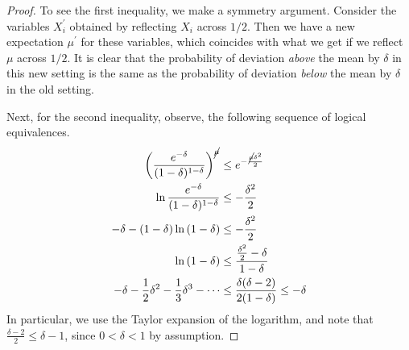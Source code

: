 \documentclass[11pt]{article}
\begin{document}
\begin{proof}
    To see the first inequality, we make a symmetry argument.
    Consider the variables $X^\prime_i$ obtained by reflecting $X_i$ across
    $1/2$.
    Then we have a new expectation $\mu^\prime$ for these variables, which
    coincides with what we get if we reflect $\mu$ across $1/2$.
    It is clear that the probability of deviation \emph{above} the mean by
    $\delta$ in this new setting is the same as the probability of deviation
    \emph{below} the mean by $\delta$ in the old setting.

    Next, for the second inequality, observe, the following sequence of logical
    equivalences.
    \begin{align*}
        \left(
            \frac{e^{-\delta}}{(1-\delta)^{1-\delta}}
        \right)^{\cancel{\mu}}
        &\leq
        e^{- \frac{\cancel{\mu} \delta^2}{2}}
        \\
        \ln{\frac{e^{-\delta}}{(1-\delta)^{1-\delta}}}
        &\leq
        -\frac{\delta^2}{2}
        \\
        -\delta - (1-\delta) \ln{\left(1-\delta\right)}
        &\leq
        -\frac{\delta^2}{2}
        \\
        \ln{\left(1 - \delta\right)}
        &\leq
        \frac{\frac{\delta^2}{2} - \delta}{1 - \delta}
        \\
        - \delta - \frac{1}{2} \delta^2 - \frac{1}{3} \delta^3 - \cdots
        &\leq
        \frac{\delta(\delta - 2)}{2(1 - \delta)}
        \leq - \delta
    \end{align*}
    In particular, we use the Taylor expansion of the logarithm, and note that
    $\frac{\delta - 2}{2} \leq \delta - 1$, since $0 < \delta < 1$ by
    assumption.
\end{proof}
\end{document}
